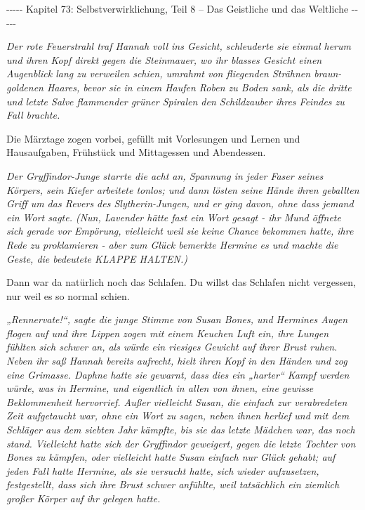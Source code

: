 

\hypertarget{selbstverwirklichung-teil-8-das-geistliche-und-das-weltliche}{%

-\/-\/-\/-\/- Kapitel 73: Selbstverwirklichung, Teil 8 -- Das Geistliche und das Weltliche -\/-\/-\/-\/-

\emph{\emph{Der rote Feuerstrahl traf Hannah voll ins Gesicht, schleuderte sie einmal herum und ihren Kopf direkt gegen die Steinmauer, wo ihr blasses Gesicht einen Augenblick lang zu verweilen schien, umrahmt von fliegenden Strähnen braun-goldenen Haares, bevor sie in einem Haufen Roben zu Boden sank, als die dritte und letzte Salve flammender grüner Spiralen den Schildzauber ihres Feindes zu Fall brachte.}}

Die Märztage zogen vorbei, gefüllt mit Vorlesungen und Lernen und Hausaufgaben, Frühstück und Mittagessen und Abendessen.

\emph{\emph{Der Gryffindor-Junge starrte die acht an, Spannung in jeder Faser seines Körpers, sein Kiefer arbeitete tonlos; und dann lösten seine Hände ihren geballten Griff um das Revers des Slytherin-Jungen, und er ging davon, ohne dass jemand ein Wort sagte. (Nun, Lavender hätte fast ein Wort gesagt - ihr Mund öffnete sich gerade vor Empörung, vielleicht weil sie keine Chance bekommen hatte, ihre Rede zu proklamieren - aber zum Glück bemerkte Hermine es und machte die Geste, die bedeutete KLAPPE HALTEN.)}}

Dann war da natürlich noch das Schlafen. Du willst das Schlafen nicht vergessen, nur weil es so normal schien.

\emph{\emph{„Rennervate!“, sagte die junge Stimme von Susan Bones, und Hermines Augen flogen auf und ihre Lippen zogen mit einem Keuchen Luft ein, ihre Lungen fühlten sich schwer an, als würde ein riesiges Gewicht auf ihrer Brust ruhen. Neben ihr saß Hannah bereits aufrecht, hielt ihren Kopf in den Händen und zog eine Grimasse. Daphne hatte sie gewarnt, dass dies ein „harter“ Kampf werden würde, was in Hermine, und eigentlich in allen von ihnen, eine gewisse Beklommenheit hervorrief. Außer vielleicht Susan, die einfach zur verabredeten Zeit aufgetaucht war, ohne ein Wort zu sagen, neben ihnen herlief und mit dem Schläger aus dem siebten Jahr kämpfte, bis sie das letzte Mädchen war, das noch stand. Vielleicht hatte sich der Gryffindor geweigert, gegen die letzte Tochter von Bones zu kämpfen, oder vielleicht hatte Susan einfach nur Glück gehabt; auf jeden Fall hatte Hermine, als sie versucht hatte, sich wieder aufzusetzen, festgestellt, dass sich ihre Brust schwer anfühlte, weil tatsächlich ein ziemlich großer Körper auf ihr gelegen hatte.}}

}
